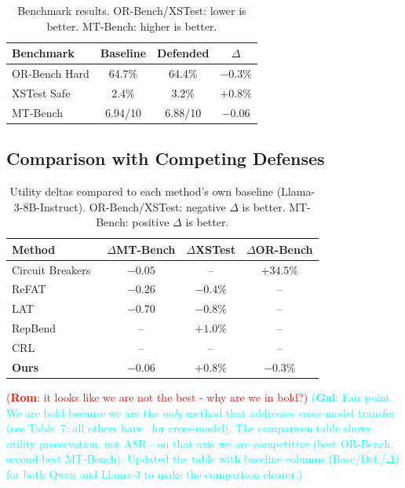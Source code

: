 \documentclass[11pt]{article}
\newcommand\rom[1]{\textcolor{red}{(\textbf{Rom}: #1)}} %
\newcommand\gal[1]{\textcolor{cyan}{(\textbf{Gal}: #1)}} %
\begin{document}
\begin{table}[h]
\centering
\caption{Benchmark results. OR-Bench/XSTest: lower is better. MT-Bench: higher is better.}
\label{tab:benchmark_results}
\begin{tabular}{@{}lccc@{}}
\toprule
\textbf{Benchmark} & \textbf{Baseline} & \textbf{Defended} & \textbf{$\Delta$} \\
\midrule
OR-Bench Hard  & 64.7\% & 64.4\% & $-0.3\%$ \\
XSTest Safe    & 2.4\%  & 3.2\%  & $+0.8\%$ \\
MT-Bench       & 6.94/10 & 6.88/10 & $-0.06$ \\
\bottomrule
\end{tabular}
\end{table}

\subsection{Comparison with Competing Defenses}

\begin{table}[h]
\centering
\caption{Utility deltas compared to each method's own baseline (Llama-3-8B-Instruct). OR-Bench/XSTest: negative $\Delta$ is better. MT-Bench: positive $\Delta$ is better.}
\label{tab:comparison}
\begin{tabular}{@{}lccc@{}}
\toprule
\textbf{Method} & $\Delta$\textbf{MT-Bench} & $\Delta$\textbf{XSTest} & $\Delta$\textbf{OR-Bench} \\
\midrule
Circuit Breakers~\cite{zou2024circuitbreakers} & $-0.05$ & -- & $+34.5\%$ \\
ReFAT~\cite{refat}            & $-0.26$ & $-0.4\%$ & -- \\
LAT~\cite{lat}                & $-0.70$ & $-0.8\%$ & -- \\
RepBend~\cite{repbend}        & --      & $+1.0\%$ & -- \\
CRL~\cite{crl}                & --      & --       & -- \\
\midrule
\textbf{Ours}                 & $\mathbf{-0.06}$ & $+0.8\%$ & $\mathbf{-0.3\%}$ \\
\bottomrule
\end{tabular}
\end{table}

\rom{it looks like we are not the best - why are we in bold?} \gal{Fair point. We are bold because we are the \emph{only} method that addresses cross-model transfer (see Table~7: all others have \xmark\ for cross-model). The comparison table shows utility preservation, not ASR---on that axis we are competitive (best OR-Bench, second-best MT-Bench). Updated the table with baseline columns (Base/Def./$\Delta$) for both Qwen and Llama-3 to make the comparison clearer.}
\end{document}
